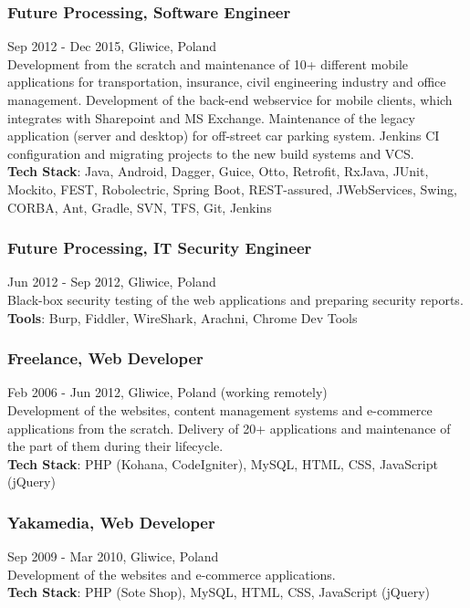 \documentclass{article}
\begin{document}
      \subsubsection*{Future Processing, Software Engineer}
      Sep 2012 - Dec 2015, Gliwice, Poland\\[0.3em]
      Development from the scratch and maintenance of 10+ different mobile applications for transportation, 
      insurance, civil engineering industry and office management. 
      Development of the back-end webservice for mobile clients, which integrates with Sharepoint and MS Exchange. 
      Maintenance of the legacy application (server and desktop) for off-street car parking system. 
      Jenkins CI configuration and migrating projects to the new build systems and VCS.\\
      \textbf{Tech Stack}: Java, Android, Dagger, Guice, Otto, Retrofit, RxJava, 
      JUnit, Mockito, FEST, Robolectric, Spring Boot, REST-assured, JWebServices, 
      Swing, CORBA, Ant, Gradle, SVN, TFS, Git, Jenkins

      \subsubsection*{Future Processing, IT Security Engineer}
      Jun 2012 - Sep 2012, Gliwice, Poland\\[0.3em]
      Black-box security testing of the web applications and preparing security reports.\\
      \textbf{Tools}: Burp, Fiddler, WireShark, Arachni, Chrome Dev Tools

      \subsubsection*{Freelance, Web Developer}
      Feb 2006 - Jun 2012, Gliwice, Poland (working remotely)\\[0.3em]
      Development of the websites, content management systems and e-commerce applications from the scratch.
      Delivery of 20+ applications and maintenance of the part of them during their lifecycle.\\
      \textbf{Tech Stack}: PHP (Kohana, CodeIgniter), MySQL, HTML, CSS, JavaScript (jQuery)

      \subsubsection*{Yakamedia, Web Developer}
      Sep 2009 - Mar 2010, Gliwice, Poland\\[0.3em]
      Development of the websites and e-commerce applications.\\
      \textbf{Tech Stack}: PHP (Sote Shop), MySQL, HTML, CSS, JavaScript (jQuery)
\end{document}
